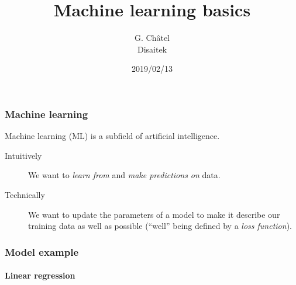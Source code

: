 \documentclass[9pt]{beamer}
\title{Machine learning basics}
\author{G. Châtel \\ Disaitek}
\date{2019/02/13}
\begin{document}
\begin{frame}

  \maketitle

\end{frame}

\begin{frame}

  \frametitle{Machine learning}

  Machine learning (ML) is a subfield of artificial intelligence.

  \bigskip

  \begin{description}
    \item[Intuitively] We want to \emph{learn from} and \emph{make predictions
    on} data.

      \medskip

    \item[Technically] We want to update the parameters of a model to
      make it describe our training data as well as possible (``well''
      being defined by a \emph{loss function}).
  \end{description}

\end{frame}

\begin{frame}
  \frametitle{Model example}

  \framesubtitle{Linear regression}

  \begin{center}
    \scalebox{1.3}{
      
    }
  \end{center}

\end{frame}
\end{document}

